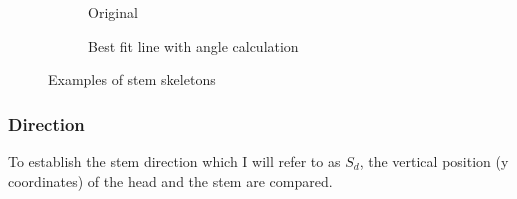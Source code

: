 \begin{figure}[h!]
    \centering

    \begin{subfigure}[b]{.45\linewidth}
        \centering
        \caption{Original}
    \end{subfigure}
    \begin{subfigure}[b]{.45\linewidth}
        \centering
        \caption{Best fit line with angle calculation}
    \end{subfigure}

    \caption{Examples of stem skeletons}
    \label{fig:stem-skeletons}
\end{figure}




\subsubsection{Direction}\label{sec:scoring-stem-direction}

To establish the stem direction which I will refer to as $S_d$, the vertical position (y coordinates) of the head and the stem are compared.

